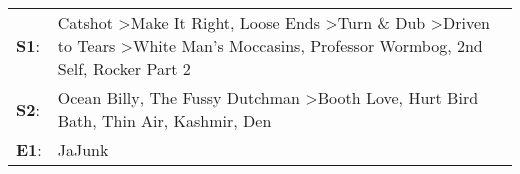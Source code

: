\begin{supertabular}{p{0.03\textwidth}p{0.92\textwidth}}
 \textbf{S1}:  &  Catshot\textsuperscript{} \textgreater \enspace Make It Right\textsuperscript{}, \enspace Loose Ends\textsuperscript{} \textgreater \enspace Turn \& Dub\textsuperscript{} \textgreater \enspace Driven to Tears\textsuperscript{} \textgreater \enspace White Man's Moccasins\textsuperscript{}, \enspace Professor Wormbog\textsuperscript{}, \enspace 2nd Self\textsuperscript{}, \enspace Rocker Part 2\textsuperscript{}  \enspace  \\
 \textbf{S2}:  &                                                                                                                                            Ocean Billy\textsuperscript{}, \enspace The Fussy Dutchman\textsuperscript{} \textgreater \enspace Booth Love\textsuperscript{}, \enspace Hurt Bird Bath\textsuperscript{}, \enspace Thin Air\textsuperscript{}, \enspace Kashmir\textsuperscript{}, \enspace Den\textsuperscript{}  \enspace  \\
 \textbf{E1}:  &                                                                                                                                                                                                                                                                                                                                                                                                       JaJunk\textsuperscript{}  \enspace  \\
\end{supertabular}
